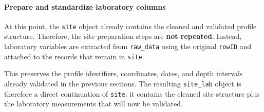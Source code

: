 \documentclass[
  10pt,
  b5paper,
  oneside]{book}
\begin{document}
\paragraph*{Prepare and standardize laboratory columns}\label{prepare-and-standardize-laboratory-columns}

At this point, the \texttt{site} object already contains the cleaned and validated profile structure. Therefore, the site preparation steps are \textbf{not repeated}. Instead, laboratory variables are extracted from \texttt{raw\_data} using the original \texttt{rowID} and attached to the records that remain in \texttt{site}.

This preserves the profile identifiers, coordinates, dates, and depth intervals already validated in the previous sections. The resulting \texttt{site\_lab} object is therefore a direct continuation of \texttt{site}: it contains the cleaned site structure plus the laboratory measurements that will now be validated.
\end{document}
